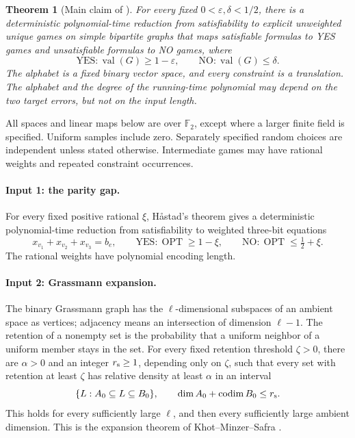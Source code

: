 \documentclass[11pt]{article}
\newtheorem{theorem}{Theorem}
\newcommand{\F}{\mathbb F}
\newcommand{\eps}{\varepsilon}
\newcommand{\val}{\operatorname{val}}
\newcommand{\OPT}{\operatorname{OPT}}
\begin{document}
\begin{theorem}[Main claim of \cite{UGT}]\label{thm:main}
For every fixed $0<\eps,\delta<1/2$, there is a deterministic polynomial-time
reduction from satisfiability to explicit unweighted unique games on
simple bipartite graphs that maps satisfiable formulas to YES games and
unsatisfiable formulas to NO games, where
\[
 \mathrm{YES}:\val(G)\ge1-\eps,
 \qquad \mathrm{NO}:\val(G)\le\delta.
\]
The alphabet is a fixed binary vector space, and every constraint is a
translation. The alphabet and the degree of the running-time polynomial may depend
on the two target errors, but not on the input length.
\end{theorem}

All spaces and linear maps below are over $\F_2$, except where a larger
finite field is specified. Uniform samples include zero. Separately
specified random choices are independent unless stated otherwise.
Intermediate games may have rational weights and repeated constraint
occurrences.

\paragraph{Input 1: the parity gap.}
For every fixed positive rational $\xi$, H\aa stad's theorem
\cite[Theorem 5.4 and its proof]{Hastad} gives a deterministic
polynomial-time reduction from satisfiability to weighted three-bit equations
\[
 x_{v_1}+x_{v_2}+x_{v_3}=b_e,
 \qquad \mathrm{YES}:\OPT\ge1-\xi,
 \qquad \mathrm{NO}:\OPT\le\tfrac12+\xi.
\]
The rational weights have polynomial encoding length.

\paragraph{Input 2: Grassmann expansion.}
The binary Grassmann graph has the $\ell$-dimensional subspaces of an
ambient space as vertices; adjacency means an intersection of dimension
$\ell-1$. The retention of a nonempty set is the probability that a uniform
neighbor of a uniform member stays in the set. For every fixed retention
threshold $\zeta>0$, there are $\alpha>0$ and an integer $r_{\rm s}\ge1$, depending
only on $\zeta$, such that every set with retention at least $\zeta$ has
relative density at least $\alpha$ in an interval
\[
 \{L:A_0\subseteq L\subseteq B_0\},
 \qquad \dim A_0+\operatorname{codim}B_0\le r_{\rm s}.
\]
This holds for every sufficiently large $\ell$, and then every sufficiently
large ambient dimension. This is the expansion theorem of
Khot--Minzer--Safra \cite[Theorem 1.12]{KMS}.
\end{document}
